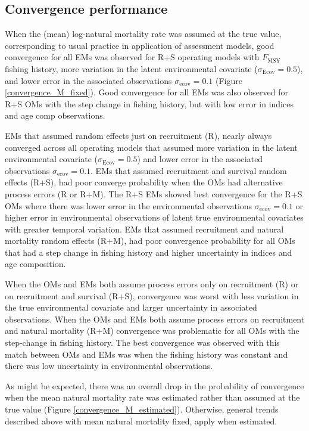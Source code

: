 \documentclass[
  12pt,
]{article}
\newcommand{\Fmsy}{\ensuremath{F_{\text{MSY}}}\xspace}
\begin{document}
\hypertarget{convergence-performance}{%
\subsection*{Convergence performance}\label{convergence-performance}}

When the (mean) log-natural mortality rate was assumed at the true value, corresponding to usual practice in application of assessment models, good convergence for all EMs was observed for R+S operating models with \Fmsy fishing history, more variation in the latent environmental covariate (\(\sigma_\text{Ecov} = 0.5\)), and lower error in the associated observations \(\sigma_\text{ecov} = 0.1\) (Figure \ref{convergence_M_fixed}). Good convergence for all EMs was also observed for R+S OMs with the step change in fishing history, but with low error in indices and age comp observations.

EMs that assumed random effects just on recruitment (R), nearly always converged across all operating models that assumed more variation in the latent environmental covariate (\(\sigma_\text{Ecov} = 0.5\)) and lower error in the associated observations \(\sigma_\text{ecov} = 0.1\). EMs that assumed recruitment and survival random effects (R+S), had poor converge probability when the OMs had alternative process errors (R or R+M). The R+S EMs showed best convergence for the R+S OMs where there was lower error in the environmental observations \(\sigma_\text{ecov} = 0.1\) or higher error in environmental observations of latent true environmental covariates with greater temporal variation. EMs that assumed recruitment and natural mortality random effects (R+M), had poor convergence probability for all OMs that had a step change in fishing history and higher uncertainty in indices and age composition.

When the OMs and EMs both assume process errors only on recruitment (R) or on recruitment and survival (R+S), convergence was worst with less variation in the true environmental covariate and larger uncertainty in associated observations. When the OMs and EMs both assume process errors on recruitment and natural mortality (R+M) convergence was problematic for all OMs with the step-change in fishing history. The best convergence was observed with this match between OMs and EMs was when the fishing history was constant and there was low uncertainty in environmental observations.

As might be expected, there was an overall drop in the probability of convergence when the mean natural mortality rate was estimated rather than assumed at the true value (Figure \ref{convergence_M_estimated}). Otherwise, general trends described above with mean natural mortality fixed, apply when estimated.
\end{document}
